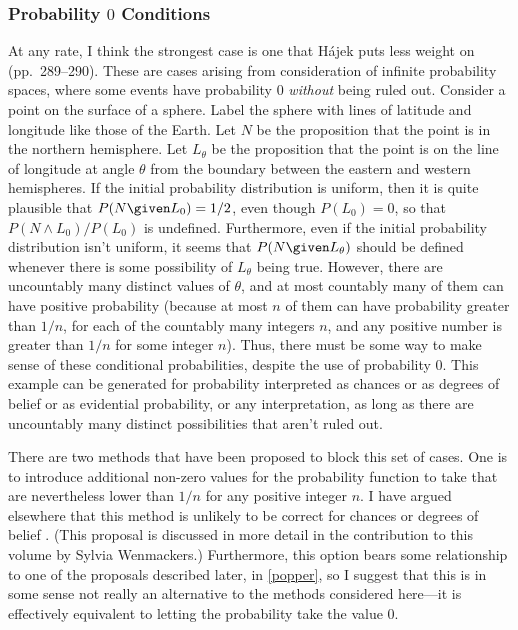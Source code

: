 \subsubsection{Probability $0$ Conditions}

At any rate, I think the strongest case is one that H\'{a}jek puts less weight on (pp.\ 289--290). These are cases arising from consideration of infinite probability spaces, where some events have probability $0$ \emph{without} being ruled out. Consider a point on the surface of a sphere. Label the sphere with lines of latitude and longitude like those of the Earth. Let $N$ be the proposition that the point is in the northern hemisphere. Let $L_\theta$ be the proposition that the point is on the line of longitude at angle $\theta$ from the boundary between the eastern and western hemispheres. If the initial probability distribution is uniform, then it is quite plausible that $P(N \given L_0)=1/2$, even though $P(L_0)=0$, so that $P(N\land L_0)/P(L_0)$ is undefined. Furthermore, even if the initial probability distribution isn't uniform, it seems that $P(N \given L_\theta)$ should be defined whenever there is some possibility of $L_\theta$ being true. However, there are uncountably many distinct values of $\theta$, and at most countably many of them can have positive probability (because at most $n$ of them can have probability greater than $1/n$, for each of the countably many integers $n$, and any positive number is greater than $1/n$ for some integer $n$). Thus, there must be some way to make sense of these conditional probabilities, despite the use of  probability $0$. This example can be generated for probability interpreted as chances or as degrees of belief or as evidential probability, or any interpretation, as long as there are uncountably many distinct possibilities that aren't ruled out.

There are two methods that have been proposed to block this set of cases. One is to introduce additional non-zero values for the probability function to take that are nevertheless lower than $1/n$ for any positive integer $n$. I have argued elsewhere that this method is unlikely to be correct for chances or degrees of belief \citep{easwaranregularity}. (This proposal is discussed in more detail in the contribution to this volume by Sylvia Wenmackers.) Furthermore, this option bears some relationship to one of the proposals described later, in \autoref{popper}, so I suggest that this is in some sense not really an alternative to the methods considered here---it is effectively equivalent to letting the probability take the value $0$.

